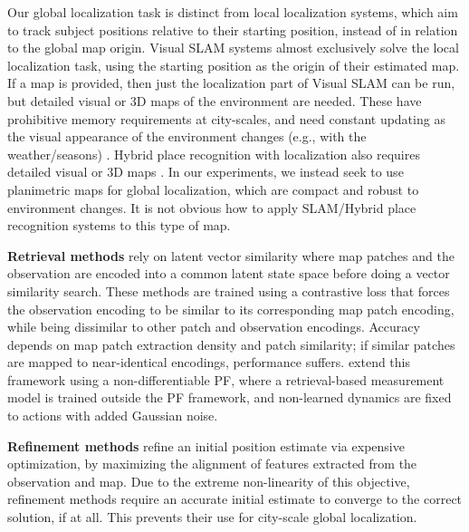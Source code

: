         Our global localization task is distinct from local localization systems, which aim to track subject positions relative to their starting position, instead of in relation to the global map origin. Visual SLAM systems \cite{probabilistic_robotics} almost exclusively solve the local localization task, using the starting position as the origin of their estimated map. If a map is provided, then just the localization part of Visual SLAM can be run, but detailed visual or 3D maps of the environment are needed. These have prohibitive memory requirements at city-scales, and need constant updating as the visual appearance of the environment changes (e.g., with the weather/seasons) \cite{sarlin2023orienternet}. Hybrid place recognition with localization also requires detailed visual or 3D maps \cite{wang_2023}. In our experiments, we instead seek to use planimetric maps for global localization, which are compact and robust to environment changes. It is not obvious how to apply SLAM/Hybrid place recognition systems to this type of map. 

             
            \textbf{Retrieval methods} \cite{shi2020where, Hu_2018_CVPR,noe2020eccv,  zhu2021vigor, NEURIPS2019_ba2f0015, shi2019optimal, xia2022visual} rely on latent vector similarity where map patches and the observation are encoded into a common latent state space before doing a vector similarity search. These methods are trained using a contrastive loss \cite{Hu_2018_CVPR, Schroff_2015_CVPR} that forces the observation encoding to be similar to its corresponding map patch encoding, while being dissimilar to other patch and observation encodings. Accuracy depends on map patch extraction density and patch similarity; if similar patches are mapped to near-identical encodings, performance suffers.  \citet{9635972GausePF} extend this framework using a non-differentiable PF, where a retrieval-based measurement model is trained outside the PF framework, and  non-learned dynamics are fixed to actions with added Gaussian noise.          

            \textbf{Refinement methods} \cite{shi2020beyond, sarlin21pixloc} refine an initial position estimate via expensive optimization, by maximizing the alignment of features extracted from the observation and map. Due to the extreme non-linearity of this objective, refinement methods require an accurate initial estimate to converge to the correct solution, if at all.  This prevents their use for city-scale global localization. %
                    
